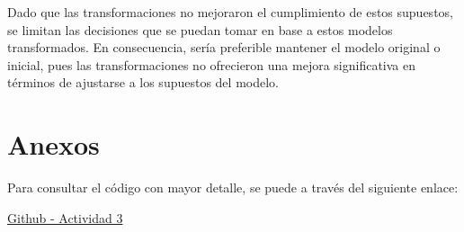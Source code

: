 \documentclass[
]{article}
\begin{document}
Dado que las transformaciones no mejoraron el cumplimiento de estos
supuestos, se limitan las decisiones que se puedan tomar en base a estos
modelos transformados. En consecuencia, sería preferible mantener el
modelo original o inicial, pues las transformaciones no ofrecieron una
mejora significativa en términos de ajustarse a los supuestos del
modelo.

\section{Anexos}\label{anexos}

Para consultar el código con mayor detalle, se puede a través del
siguiente enlace:

\href{https://github.com/JuanjoRestrepo/Master-Data-Science/tree/main/Metodos\%20Estadisticos/Actividad_03}{Github
- Actividad 3}
\end{document}
